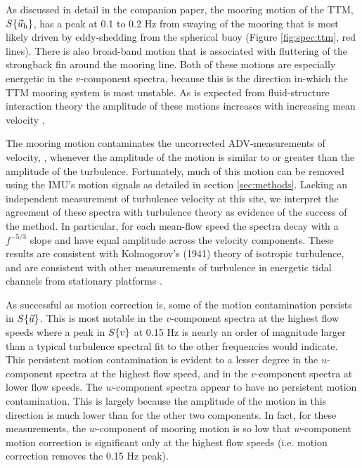 As discussed in detail in the companion paper, the mooring motion of the TTM, $S\{\vec{u}_\mathrm{h}\}$, has a peak at 0.1 to 0.2 Hz from swaying of the mooring that is most likely driven by eddy-shedding from the spherical buoy (Figure \ref{fig:spec:ttm}, red lines). There is also broad-band motion that is associated with fluttering of the strongback fin around the mooring line. Both of these motions are especially energetic in the $v$-component spectra, because this is the direction in-which the TTM mooring system is most unstable. As is expected from fluid-structure interaction theory the amplitude of these motions increases with increasing mean velocity \cite[]{Morison++1950}.

The mooring motion contaminates the uncorrected ADV-measurements of velocity, \spec{\umeas}, whenever the amplitude of the motion is similar to or greater than the amplitude of the turbulence. Fortunately, much of this motion can be removed using the IMU's motion signals as detailed in section \ref{sec:methods}. Lacking an independent measurement of turbulence velocity at this site, we interpret the agreement of these spectra with turbulence theory as evidence of the success of the method. In particular, for each mean-flow speed the spectra decay with a $f^{-5/3}$ slope and have equal amplitude across the velocity components. These results are consistent with Kolmogorov's (1941) theory of isotropic turbulence, and are consistent with other measurements of turbulence in energetic tidal channels from stationary platforms \citep[]{Kolmogorov1941c,Walter++2011,Thomson++2012,McMillan++2016}.

As successful as motion correction is, some of the motion contamination persists in $S\{\vec{u}\}$. This is most notable in the $v$-component spectra at the highest flow speeds where a peak in $S\{v\}$ at 0.15 Hz is nearly an order of magnitude larger than a typical turbulence spectral fit to the other frequencies would indicate. This persistent motion contamination is evident to a lesser degree in the $u$-component spectra at the highest flow speed, and in the $v$-component spectra at lower flow speeds.  The $w$-component spectra appear to have no persistent motion contamination. This is largely because the amplitude of the motion in this direction is much lower than for the other two components. In fact, for these measurements, the $w$-component of mooring motion is so low that $w$-component motion correction is significant only at the highest flow speeds (i.e. motion correction removes the 0.15 Hz peak).

